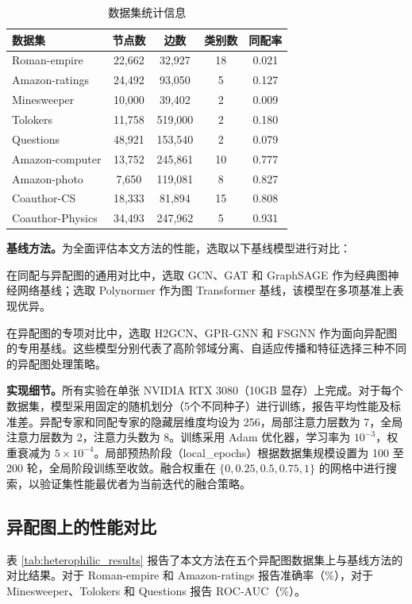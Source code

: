 \documentclass[a4paper,10pt]{article}
\begin{document}
\begin{table}[t]
\centering
\caption{数据集统计信息}
\label{tab:datasets}
\begin{tabular}{l c c c c}
\toprule
数据集 & 节点数 & 边数 & 类别数 & 同配率 \\
\midrule
Roman-empire & 22,662 & 32,927 & 18 & 0.021 \\
Amazon-ratings & 24,492 & 93,050 & 5 & 0.127 \\
Minesweeper & 10,000 & 39,402 & 2 & 0.009 \\
Tolokers & 11,758 & 519,000 & 2 & 0.180 \\
Questions & 48,921 & 153,540 & 2 & 0.079 \\
Amazon-computer & 13,752 & 245,861 & 10 & 0.777 \\
Amazon-photo & 7,650 & 119,081 & 8 & 0.827 \\
Coauthor-CS & 18,333 & 81,894 & 15 & 0.808 \\
Coauthor-Physics & 34,493 & 247,962 & 5 & 0.931 \\
\bottomrule
\end{tabular}
\end{table}

\noindent\textbf{基线方法。}为全面评估本文方法的性能，选取以下基线模型进行对比：

在同配与异配图的通用对比中，选取 GCN、GAT 和 GraphSAGE 作为经典图神经网络基线；选取 Polynormer 作为图 Transformer 基线，该模型在多项基准上表现优异。

在异配图的专项对比中，选取 H2GCN、GPR-GNN 和 FSGNN 作为面向异配图的专用基线。这些模型分别代表了高阶邻域分离、自适应传播和特征选择三种不同的异配图处理策略。

\noindent\textbf{实现细节。}所有实验在单张 NVIDIA RTX 3080（10GB 显存）上完成。对于每个数据集，模型采用固定的随机划分（5个不同种子）进行训练，报告平均性能及标准差。异配专家和同配专家的隐藏层维度均设为 256，局部注意力层数为 7，全局注意力层数为 2，注意力头数为 8。训练采用 Adam 优化器，学习率为 $10^{-3}$，权重衰减为 $5\times10^{-4}$。局部预热阶段（local\_epochs）根据数据集规模设置为 100 至 200 轮，全局阶段训练至收敛。融合权重在 $\{0, 0.25, 0.5, 0.75, 1\}$ 的网格中进行搜索，以验证集性能最优者为当前迭代的融合策略。

\subsection{异配图上的性能对比}

表 \ref{tab:heterophilic_results} 报告了本文方法在五个异配图数据集上与基线方法的对比结果。对于 Roman-empire 和 Amazon-ratings 报告准确率（\%），对于 Minesweeper、Tolokers 和 Questions 报告 ROC-AUC（\%）。
\end{document}
